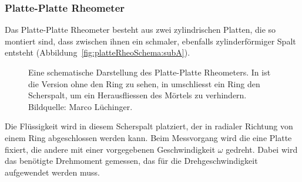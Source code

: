 \subsubsection{Platte-Platte Rheometer}
\label{Kapitel:Parameter:PlattePlatteRheo}
Das Platte-Platte Rheometer besteht aus zwei zylindrischen Platten, die so montiert sind, dass zwischen ihnen ein schmaler, ebenfalls zylinderförmiger Spalt entsteht (Abbildung~\ref{fig:platteRheoSchema:subA}).
\begin{figure}[tb]
    \centering
    \caption{Eine schematische Darstellung des Platte-Platte Rheometers. In  ist die Version ohne den Ring zu sehen, in  umschliesst ein Ring den Scherspalt, um ein Herausfliessen des Mörtels zu verhindern.\\
    Bildquelle: Marco Lüchinger.}
    \label{fig:kapRheo}
\end{figure}
Die Flüssigkeit wird in diesem Scherspalt platziert, der in radialer Richtung von einem Ring abgeschlossen werden kann. Beim Messvorgang wird die eine Platte fixiert, die andere mit einer vorgegebenen Geschwindigkeit $\omega$ gedreht.
Dabei wird das benötigte Drehmoment gemessen, das für die Drehgeschwindigkeit aufgewendet werden muss.

